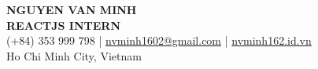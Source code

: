 \begin{center}
    {\fontsize{25}{28}\selectfont\bfseries NGUYEN VAN MINH}\\[4pt]
    {\large\bfseries REACTJS INTERN}\\[6pt]
    (+84) 353 999 798 \;|\; \href{mailto:nvminh1602@gmail.com}{nvminh1602@gmail.com} \;|\; \href{https://nvminh162.id.vn}{nvminh162.id.vn}\\[3pt]
    Ho Chi Minh City, Vietnam
    \\ \vspace{-1pt}
\end{center}
